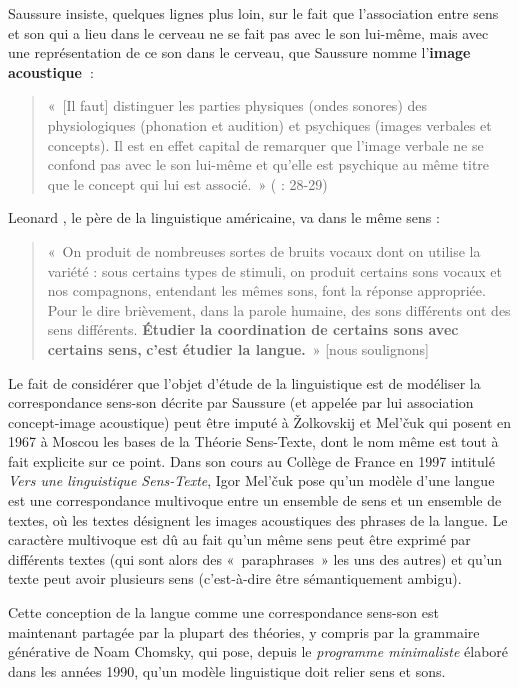 {    Saussure insiste, quelques lignes plus loin, sur le fait que l’association entre sens et son qui a lieu dans le cerveau ne se fait pas avec le son lui-même, mais avec une représentation de ce son dans le cerveau, que Saussure nomme l’\textbf{image acoustique~}:

    \begin{quote}
    «~[Il faut] distinguer les parties physiques (ondes sonores) des physiologiques (phonation et audition) et psychiques (images verbales et concepts). Il est en effet capital de remarquer que l’image verbale ne se confond pas avec le son lui-même et qu’elle est psychique au même titre que le concept qui lui est associé.~» (\citealt{Saussure1916} : 28-29)
    \end{quote}

    Leonard \citet[27]{Bloomfield1933}, le père de la linguistique américaine, va dans le même sens :

    \begin{quote}
    «~On produit de nombreuses sortes de bruits vocaux dont on utilise la variété : sous certains types de stimuli, on produit certains sons vocaux et nos compagnons, entendant les mêmes sons, font la réponse appropriée. Pour le dire brièvement, dans la parole humaine, des sons différents ont des sens différents. \textbf{Étudier} \textbf{la coordination de certains sons avec certains sens,} \textbf{c’est} \textbf{étudier la langue.}~» [nous soulignons]
    \end{quote}

    Le fait de considérer que l’objet d’étude de la linguistique est de modéliser la correspondance sens-son décrite par Saussure (et appelée par lui association concept-image acoustique) peut être imputé à Žolkovskij et Mel’čuk qui posent en 1967 à Moscou les bases de la Théorie Sens-Texte, dont le nom même est tout à fait explicite sur ce point. Dans son cours au Collège de France en 1997 intitulé \textit{Vers une linguistique Sens-Texte}, Igor Mel’čuk pose qu’un modèle d’une langue est une correspondance multivoque entre un ensemble de sens et un ensemble de textes, où les textes désignent les images acoustiques des phrases de la langue. Le caractère multivoque est dû au fait qu’un même sens peut être exprimé par différents textes (qui sont alors des «~paraphrases~» les uns des autres) et qu’un texte peut avoir plusieurs sens (c’est-à-dire être sémantiquement ambigu).

    Cette conception de la langue comme une correspondance sens-son est maintenant partagée par la plupart des théories, y compris par la grammaire générative de Noam Chomsky, qui pose, depuis le \textit{programme minimaliste} élaboré dans les années 1990, qu’un modèle linguistique doit relier sens et sons.
}
